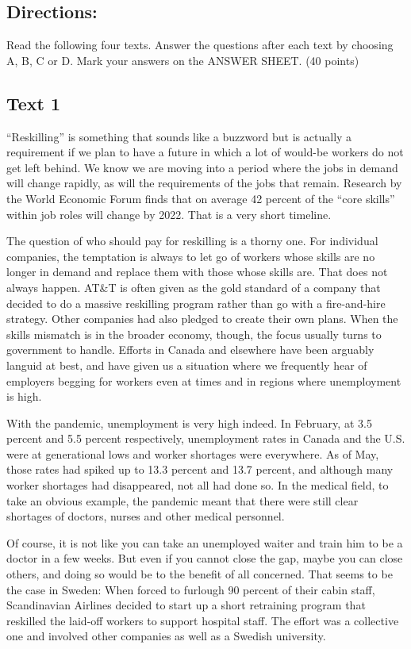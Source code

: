 \documentclass[UTF8,11pt]{ctexart}
\begin{document}
\subsection*{\textbf{Directions:}}


Read the following four texts. Answer the questions after each text by choosing A, B, C or D. Mark your answers on the ANSWER SHEET. (40 points)


\subsection*{\textbf{Text 1}}


“Reskilling” is something that sounds like a buzzword but is actually a requirement if we plan to have a future in which a lot of would-be workers do not get left behind. We know we are moving into a period where the jobs in demand will change rapidly, as will the requirements of the jobs that remain. Research by the World Economic Forum finds that on average 42 percent of the “core skills” within job roles will change by 2022. That is a very short timeline.


The question of who should pay for reskilling is a thorny one. For individual companies, the temptation is always to let go of workers whose skills are no longer in demand and replace them with those whose skills are. That does not always happen. AT\&T is often given as the gold standard of a company that decided to do a massive reskilling program rather than go with a fire-and-hire strategy. Other companies had also pledged to create their own plans. When the skills mismatch is in the broader economy, though, the focus usually turns to government to handle. Efforts in Canada and elsewhere have been arguably languid at best, and have given us a situation where we frequently hear of employers begging for workers even at times and in regions where unemployment is high.


With the pandemic, unemployment is very high indeed. In February, at 3.5 percent and 5.5 percent respectively, unemployment rates in Canada and the U.S. were at generational lows and worker shortages were everywhere. As of May, those rates had spiked up to 13.3 percent and 13.7 percent, and although many worker shortages had disappeared, not all had done so. In the medical field, to take an obvious example, the pandemic meant that there were still clear shortages of doctors, nurses and other medical personnel.


Of course, it is not like you can take an unemployed waiter and train him to be a doctor in a few weeks. But even if you cannot close the gap, maybe you can close others, and doing so would be to the benefit of all concerned. That seems to be the case in Sweden: When forced to furlough 90 percent of their cabin staff, Scandinavian Airlines decided to start up a short retraining program that reskilled the laid-off workers to support hospital staff. The effort was a collective one and involved other companies as well as a Swedish university.
\end{document}
